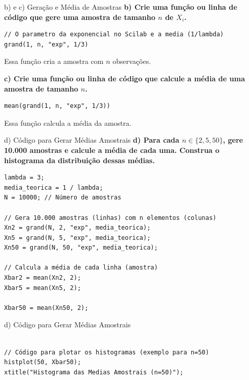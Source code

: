\begin{frame}[fragile]{b) e c) Geração e Média de Amostras}
    \textbf{b) Crie uma função ou linha de código que gere uma amostra de tamanho $n$ de $X_i$.}
    \begin{lstlisting}
// O parametro da exponencial no Scilab e a media (1/lambda)
grand(1, n, "exp", 1/3)
    \end{lstlisting}
    Essa função cria a amostra com $n$ observações.
    
    \vspace{2em}
    
    \textbf{c) Crie uma função ou linha de código que calcule a média de uma amostra de tamanho $n$.}
    \begin{lstlisting}
mean(grand(1, n, "exp", 1/3))
    \end{lstlisting}
    Essa função calcula a média da amostra.
\end{frame}

\begin{frame}[fragile]{d) Código para Gerar Médias Amostrais}
    \textbf{d) Para cada $n \in \{2, 5, 50\}$, gere 10.000 amostras e calcule a média de cada uma. Construa o histograma da distribuição dessas médias.}
    
\begin{lstlisting}
lambda = 3;
media_teorica = 1 / lambda;
N = 10000; // Número de amostras

// Gera 10.000 amostras (linhas) com n elementos (colunas)
Xn2 = grand(N, 2, "exp", media_teorica);
Xn5 = grand(N, 5, "exp", media_teorica);
Xn50 = grand(N, 50, "exp", media_teorica);

// Calcula a média de cada linha (amostra)
Xbar2 = mean(Xn2, 2);
Xbar5 = mean(Xn5, 2);

Xbar50 = mean(Xn50, 2);
\end{lstlisting}
\end{frame}

\begin{frame}[fragile]{d) Código para Gerar Médias Amostrais}
\begin{lstlisting}

// Código para plotar os histogramas (exemplo para n=50)
histplot(50, Xbar50);
xtitle("Histograma das Medias Amostrais (n=50)");
\end{lstlisting}
\end{frame}

